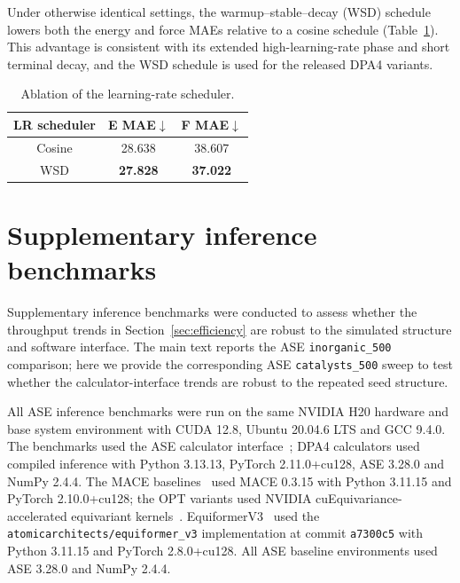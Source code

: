 Under otherwise identical settings, the warmup--stable--decay (WSD) schedule
lowers both the energy and force MAEs relative to a cosine schedule
(Table~\ref{tab:sm_training_recipe}). This advantage is consistent with its
extended high-learning-rate phase and short terminal decay, and the WSD schedule
is used for the released DPA4 variants.

\begin{table}[ht]
    \centering
    \scriptsize
    \caption{Ablation of the learning-rate scheduler.}
    \label{tab:sm_training_recipe}
    \begin{tabular*}{\linewidth}{@{\extracolsep{\fill}}ccc@{}}
        \toprule
        \textbf{LR scheduler}          &
        \textbf{E MAE}$\downarrow$     &
        \textbf{F MAE}$\downarrow$                                                        \\
        \midrule
        Cosine                          & 28.638          & 38.607          \\
        WSD                             & \textbf{27.828} & \textbf{37.022} \\
        \bottomrule
    \end{tabular*}
\end{table}

\FloatBarrier
\section{Supplementary inference benchmarks}

Supplementary inference benchmarks were conducted to assess whether the
throughput trends in Section~\ref{sec:efficiency} are robust to the simulated
structure and software interface. The main text reports the ASE
\texttt{inorganic\_500} comparison; here we provide the corresponding ASE
\texttt{catalysts\_500} sweep to test whether the calculator-interface trends
are robust to the repeated seed structure.

All ASE inference benchmarks were run on the same NVIDIA H20 hardware and base
system environment with CUDA 12.8, Ubuntu 20.04.6 LTS and GCC 9.4.0. The
benchmarks used the ASE calculator
interface~\cite{ase-paper}; DPA4 calculators used compiled inference with
Python 3.13.13, PyTorch 2.11.0+cu128, ASE 3.28.0 and NumPy 2.4.4. The MACE
baselines~\cite{batatia2022mace,barroso2024open,batatia2025crosslearning} used
MACE 0.3.15 with Python 3.11.15 and PyTorch 2.10.0+cu128; the OPT variants used
NVIDIA cuEquivariance-accelerated equivariant kernels~\cite{nvidia_cuequivariance}.
EquiformerV3~\cite{liao2026equiformerv3} used the
\texttt{atomicarchitects/equiformer\_v3} implementation at commit
\texttt{a7300c5} with Python 3.11.15 and PyTorch 2.8.0+cu128. All ASE baseline
environments used ASE 3.28.0 and NumPy 2.4.4.

